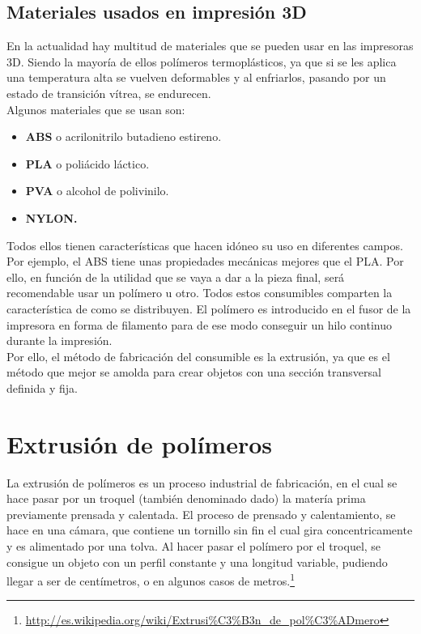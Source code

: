 \subsection{Materiales usados en impresión 3D}
\label{impreso_materiales}
En la actualidad hay multitud de materiales que se pueden usar en las impresoras 3D. Siendo la mayoría de ellos polímeros termoplásticos, ya que si se les aplica una temperatura alta se vuelven deformables y al enfriarlos, pasando por un estado de transición vítrea, se endurecen.\\

Algunos materiales que se usan son:
\begin{itemize}
    \item \textbf{ABS} o acrilonitrilo butadieno estireno.
    \item \textbf{PLA} o poliácido láctico.
    \item \textbf{PVA} o alcohol de polivinilo.
    \item \textbf{NYLON.}
\end{itemize}

Todos ellos tienen características que hacen idóneo su uso en diferentes campos. Por ejemplo, el ABS tiene unas propiedades mecánicas mejores que el PLA. Por ello, en función de la utilidad que se vaya a dar a la pieza final, será recomendable usar un polímero u otro. Todos estos consumibles comparten la característica de como se distribuyen. El polímero es introducido en el fusor de la impresora en forma de filamento para de ese modo conseguir un hilo continuo durante la impresión.\\

Por ello, el método de fabricación del consumible es la extrusión, ya que es el método que mejor se amolda para crear objetos con una sección transversal definida y fija.

\section{Extrusión de polímeros}
\label{arte_extrusion}
La extrusión de polímeros es un proceso industrial de fabricación, en el cual  se hace pasar por un troquel (también denominado dado) la matería prima previamente prensada y calentada. El proceso de prensado y calentamiento, se hace en una cámara, que contiene un tornillo sin fin el cual gira concentricamente y es alimentado por una tolva. Al hacer pasar el polímero por el troquel, se consigue un objeto con un perfil constante y una longitud variable, pudiendo llegar a ser de centímetros, o en algunos casos de metros.\footnote{ \url{http://es.wikipedia.org/wiki/Extrusi%C3%B3n_de_pol%C3%ADmero} }\\ 

